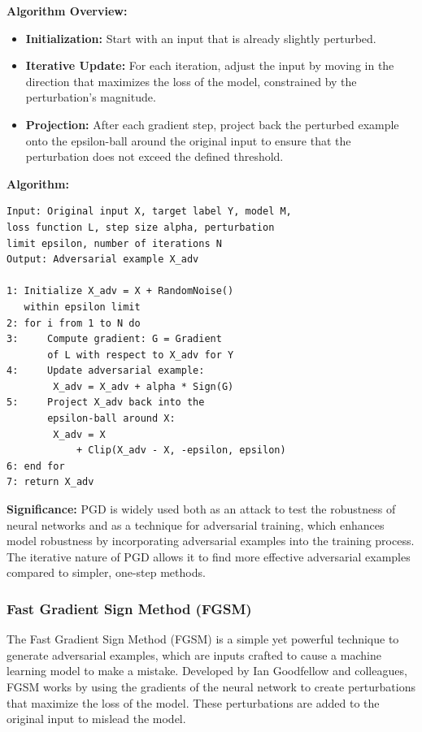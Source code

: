 \documentclass[letterpaper,twocolumn,10pt]{article}
\begin{document}
\textbf{Algorithm Overview:}
\begin{itemize}
    \item \textbf{Initialization:} Start with an input that is already slightly perturbed.
    \item \textbf{Iterative Update:} For each iteration, adjust the input by moving in the direction that maximizes the loss of the model, constrained by the perturbation's magnitude.
    \item \textbf{Projection:} After each gradient step, project back the perturbed example onto the epsilon-ball around the original input to ensure that the perturbation does not exceed the defined threshold.
\end{itemize}

\textbf{Algorithm:}
\begin{verbatim}
Input: Original input X, target label Y, model M, 
loss function L, step size alpha, perturbation 
limit epsilon, number of iterations N
Output: Adversarial example X_adv

1: Initialize X_adv = X + RandomNoise() 
   within epsilon limit
2: for i from 1 to N do
3:     Compute gradient: G = Gradient
       of L with respect to X_adv for Y
4:     Update adversarial example:
        X_adv = X_adv + alpha * Sign(G)
5:     Project X_adv back into the 
       epsilon-ball around X:
        X_adv = X
            + Clip(X_adv - X, -epsilon, epsilon)
6: end for
7: return X_adv
\end{verbatim}


\textbf{Significance:}
PGD is widely used both as an attack to test the robustness of neural networks and as a technique for adversarial training, which enhances model robustness by incorporating adversarial examples into the training process. The iterative nature of PGD allows it to find more effective adversarial examples compared to simpler, one-step methods.

\subsubsection{Fast Gradient Sign Method (FGSM)}

The Fast Gradient Sign Method (FGSM) is a simple yet powerful technique to generate adversarial examples, which are inputs crafted to cause a machine learning model to make a mistake. Developed by Ian Goodfellow and colleagues, FGSM works by using the gradients of the neural network to create perturbations that maximize the loss of the model. These perturbations are added to the original input to mislead the model.
\end{document}
